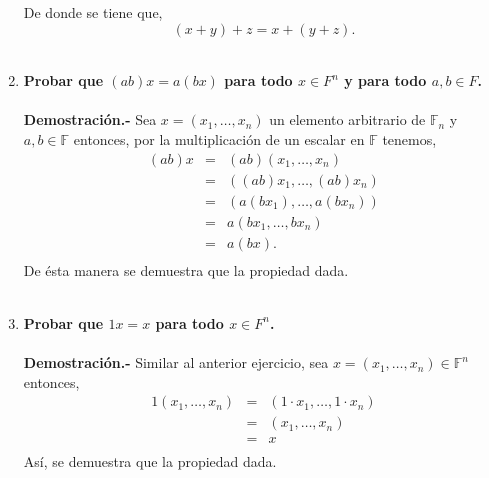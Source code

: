 \begin{multicols}{2}
\begin{enumerate}
	 De donde se tiene que,
	 $$(x+y)+z=x+(y+z).$$\\

     \item \textbf{\boldmath Probar que $(ab)x=a(bx)$ para todo $x\in F^n$ y para todo $a,b \in F$.}\\\\
	 \textbf{Demostración.-}\; Sea $x=(x_1,\ldots,x_n)$ un elemento arbitrario de $\mathbb{F}_n$ y $a,b\in \mathbb{F}$ entonces, por la multiplicación de un escalar en $\mathbb{F}$ tenemos,
	 $$\begin{array}{rcl}
	     (ab)x&=&(ab)(x_1,\ldots,x_n)\\
		  &=&((ab)x_1,\ldots,(ab)x_n)\\
		  &=&(a(bx_1),\ldots,a(bx_n))\\
		  &=&a(bx_1,\ldots,bx_n)\\
		  &=&a(bx).\\
	 \end{array}$$
	 De ésta manera se demuestra que la propiedad dada.\\\\

     \item \textbf{\boldmath Probar que $1x=x$ para todo $x\in F^n$.}\\\\
	 \textbf{Demostración.-}\; Similar al anterior ejercicio, sea $x=(x_1,\ldots,x_n) \in \mathbb{F}^n$ entonces,
	 $$\begin{array}{rcl}
	     1(x_1,\ldots,x_n)&=&(1\cdot x_1,\ldots,1\cdot x_n)\\
			      &=&(x_1,\ldots,x_n)\\
			      &=&x\\
	 \end{array}$$
	 Así, se demuestra que la propiedad dada.\\\\


\end{enumerate}
\end{multicols}
